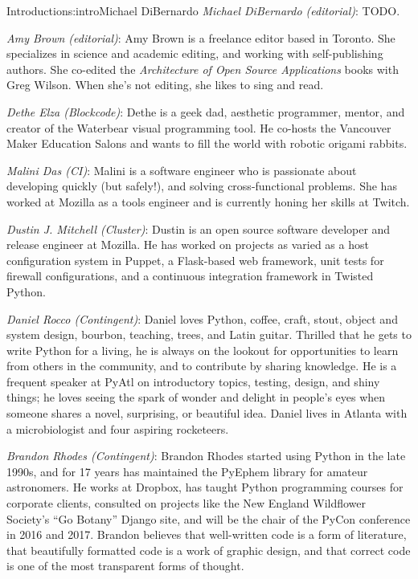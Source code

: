 \begin{aosachapter}{Introduction}{s:intro}{Michael DiBernardo}
\hspace{\parindent} \emph{Michael DiBernardo (editorial)}: TODO.

\hspace{\parindent} \emph{Amy Brown (editorial)}: Amy Brown is a freelance editor based in Toronto. She specializes in science and academic editing, and working with self-publishing authors. She co-edited the \emph{Architecture of Open Source Applications} books with Greg Wilson. When she's not editing, she likes to sing and read.

\emph{Dethe Elza (Blockcode)}: Dethe is a geek dad, aesthetic programmer, mentor, and creator of the Waterbear visual programming tool. He co-hosts the Vancouver Maker Education Salons and wants to fill the world with robotic origami rabbits. 

\emph{Malini Das (CI)}: Malini is a software engineer who is passionate about developing quickly (but safely!), and solving cross-functional problems. She has worked at Mozilla as a tools engineer and is currently honing her skills at Twitch. 

\emph{Dustin J. Mitchell (Cluster)}: Dustin is an open source software developer and release engineer at Mozilla. He has worked on projects as varied as a host configuration system in Puppet, a Flask-based web framework, unit tests for firewall configurations, and a continuous integration framework in Twisted Python. 

\emph{Daniel Rocco (Contingent)}: Daniel loves Python, coffee, craft, stout, object and system design, bourbon, teaching, trees, and Latin guitar. Thrilled that he gets to write Python for a living, he is always on the lookout for opportunities to learn from others in the community, and to contribute by sharing knowledge. He is a frequent speaker at PyAtl on introductory topics, testing, design, and shiny things; he loves seeing the spark of wonder and delight in people's eyes when someone shares a novel, surprising, or beautiful idea. Daniel lives in Atlanta with a microbiologist and four aspiring rocketeers.

\emph{Brandon Rhodes (Contingent)}: Brandon Rhodes started using Python in the late 1990s, and for 17 years has maintained the PyEphem library for amateur astronomers. He works at Dropbox, has taught Python programming courses for corporate clients, consulted on projects like the New England Wildflower Society's ``Go Botany'' Django site, and will be the chair of the PyCon conference in 2016 and 2017. Brandon believes that well-written code is a form of literature, that beautifully formatted code is a work of graphic design, and that correct code is one of the most transparent forms of thought.


\end{aosachapter}
